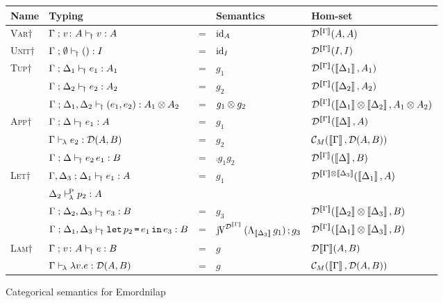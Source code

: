 \documentclass[runningheads,envcountsame]{llncs}
\newcommand{\monad}{M}
\begin{document}
\begin{figure}
    \centering
    {\def\arraystretch{1.5}
    \begin{tabular}{l|l c l l}
          Name & Typing & & Semantics & Hom-set \\
          \hline\hline
          \textsc{Var}$\dagger$
        & $\Gamma \mathrel{;} v\colon A \vdash_{\!\dagger} v : A$
        & = & $\id_{A}$ & $\D^{\sem{\Gamma}}(A, A)$
        \\ \hline
          \textsc{Unit}$\dagger$
        & $\Gamma \mathrel{;} \emptyset \vdash_{\!\dagger} () : I$
        & = & $\id_{I}$ & $\D^{\sem{\Gamma}}(I, I)$
        \\ \hline
          \multirow{3}{*}{\textsc{Tup}$\dagger$}
        & $\Gamma \mathrel{;} \Delta_1 \vdash_{\!\dagger} e_1 : A_1$ 
        & = & $g_1$ & $\D^{\sem{\Gamma}}(\sem{\Delta_1}, A_1)$ \\ 
        & $\Gamma \mathrel{;} \Delta_2 \vdash_{\!\dagger} e_2 : A_2$
        & = & $g_2$ & $\D^{\sem{\Gamma}}(\sem{\Delta_2}, A_2)$ \\ \cline{2-2}
        & $\typeruled{\Gamma}{\Delta_1, \Delta_2}{\epair{e_1}{e_2}}{\D}{\tensor{A_1}{A_2}}$
        & = & $\tensor{g_1}{g_2}$ & $\D^{\sem{\Gamma}}(\tensor{\sem{\Delta_1}}{\sem{\Delta_2}}, \tensor{A_1}{A_2})$
        \\ \hline
          \multirow{3}{*}{\textsc{App}$\dagger$}
        & $\Gamma \mathrel{;} \Delta \vdash_{\!\dagger} e_1 : A$
        & = & $g_1$ & $\D^{\sem{\Gamma}}(\sem{\Delta}, A)$ \\ 
        & $\Gamma \vdash_{\!\lambda} e_2 : \mathcal{D}(A, B)$ 
        & = & $g_2$ & $\C_\monad(\sem{\Gamma}, \homD{A}{B})$ \\ \cline{2-2}
        & $\Gamma \mathrel{;} \Delta \vdash_{\!\dagger} e_2\,e_1 : B$
        & = & $\comp{g_1}{g_2}$ & $\D^{\sem{\Gamma}}(\sem{\Delta}, B)$
        \\ \hline
          \multirow{4}{*}{\textsc{Let}$\dagger$}
        & $\Gamma, \Delta_3 \mathrel{;} \Delta_1 \vdash_{\!\dagger} e_1 : A$ 
        & = & $g_1$ & $\D^{\tensor{\sem{\Gamma}}{\sem{\Delta_3}}}(\sem{\Delta_1}, A)$ \\
        & $\Delta_2 \vdash^{\!\mathrm{P}}_{\!\lambda} p_2 : A$ \\
        & $\Gamma \mathrel{;} \Delta_2, \Delta_3 \vdash_{\!\dagger} e_3 : B$
        & = & $g_3$ & $\D^{\sem{\Gamma}}(\tensor{\sem{\Delta_2}}{\sem{\Delta_3}}, B)$ \\ \cline{2-2}
        & $\Gamma \mathrel{;} \Delta_1, \Delta_3 \vdash_{\!\dagger} \texttt{let}\,p_2\,\texttt{=}\,e_1\,\texttt{in}\,e_3 : B$
        & = & $\comp{\juncurry[\D^{\sem{\Gamma}}]\,(\curry_{\sem{\Delta_3}}\,g_1)}{g_3}$ 
        & $\D^{\sem{\Gamma}}(\tensor{\sem{\Delta_1}}{\sem{\Delta_3}}, B)$
        \\ \hline
          \multirow{2}{*}{\textsc{Lam}$\dagger$}
        & $\Gamma \mathrel{;} v\colon A \vdash_{\!\dagger} e : B$
        & = & $g$ & $\D{\sem{\Gamma}}(A, B)$ \\ \cline{2-2}
        & $\Gamma \vdash_{\!\lambda} \lambda v. e : \mathcal{D}(A, B)$
        & = & $g$ & $\C_\monad(\sem{\Gamma}, \homD{A}{B})$
        \\ \hline
    \end{tabular}}
    \caption{Categorical semantics for Emordnilap}
    \label{fig:semantics2}
\end{figure}
\end{document}

